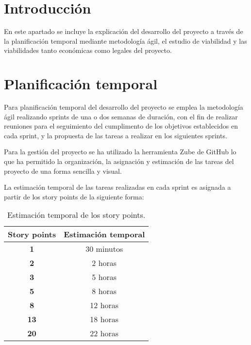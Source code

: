 
\section{Introducción}
En este apartado se incluye la explicación del desarrollo del proyecto a través de la planificación temporal mediante metodología ágil, el estudio de viabilidad y las viabilidades tanto económicas como legales del proyecto.

\section{Planificación temporal}
Para planificación temporal del desarrollo del proyecto se emplea la metodología ágil realizando sprints de una o dos semanas de duración, con el fin de realizar reuniones para el seguimiento del cumplimento de los objetivos establecidos en cada sprint, y la propuesta de las tareas a realizar en los siguientes sprints.

Para la gestión del proyecto se ha utilizado la herramienta Zube de GitHub lo que ha permitido la organización, la asignación y estimación de las tareas del proyecto de una forma sencilla y visual.

La estimación temporal de las tareas realizadas en cada sprint es asignada a partir de los story points de la siguiente forma:

\begin{table}[ht!]
    \centering
    \resizebox{8cm}{!} {
    \begin{tabular}{|c|c|}
    \hline
    \rowcolor[rgb]{0.99,0.93,0.93}
    \textbf{Story points}   & \textbf{Estimación temporal} \\ \hline
    \textbf{1}              & 30 minutos \\ \hline 
    \textbf{2}              &  2 horas \\ \hline
    \textbf{3}              &  5 horas \\ \hline 
    \textbf{5}              &  8 horas \\ \hline 
    \textbf{8}              & 12 horas \\ \hline 
    \textbf{13}              & 18 horas \\ \hline 
    \textbf{20}              & 22 horas \\ \hline 
   
    \end{tabular}}
    \caption{Estimación temporal de los story points.}
    \label{tab:my_label}
\end{table}
\newpage

